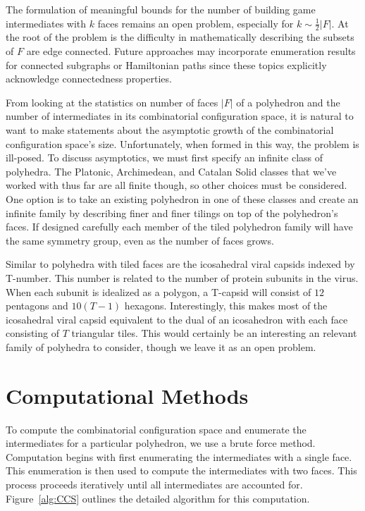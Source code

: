 The formulation of meaningful bounds for the number of building game intermediates with $k$ faces remains an open problem, especially for $k \sim \frac{1}{2}|F|$. At the root of the problem is the difficulty in mathematically describing the subsets of $F$ are edge connected. Future approaches may incorporate enumeration results for connected subgraphs or Hamiltonian paths since these topics explicitly acknowledge connectedness properties. 

From looking at the statistics on number of faces $|F|$ of a polyhedron and the number of intermediates in its combinatorial configuration space, it is natural to want to make statements about the asymptotic growth of the combinatorial configuration space's size. Unfortunately, when formed in this way, the problem is ill-posed. To discuss asymptotics, we must first specify an infinite class of polyhedra. The Platonic, Archimedean, and Catalan Solid classes that we've worked with thus far are all finite though, so other choices must be considered. One option is to take an existing polyhedron in one of these classes and create an infinite family by describing finer and finer tilings on top of the polyhedron's faces. If designed carefully each member of the tiled polyhedron family will have the same symmetry group, even as the number of faces grows. 

Similar to polyhedra with tiled faces are the icosahedral viral capsids indexed by T-number. This number is related to the number of protein subunits in the virus. When each subunit is idealized as a polygon, a T-capsid will consist of $12$ pentagons and $10(T-1)$ hexagons. Interestingly, this makes most of the icosahedral viral capsid equivalent to the dual of an icosahedron with each face consisting of $T$ triangular tiles. This would certainly be an interesting an relevant family of polyhedra to consider, though we leave it as an open problem.

\section{Computational Methods}

To compute the combinatorial configuration space and enumerate the intermediates for a particular polyhedron, we use a brute force method. Computation begins with first enumerating the intermediates with a single face. This enumeration is then used to compute the intermediates with two faces. This process proceeds iteratively until all intermediates are accounted for. Figure~\ref{alg:CCS} outlines the detailed algorithm for this computation. 

